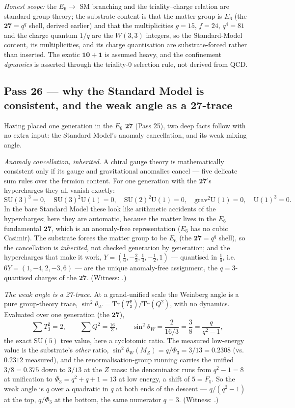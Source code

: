 \documentclass[11pt]{article}
\begin{document}
\emph{Honest scope:} the $E_6\to$ SM branching and the triality--charge relation are standard group
theory; the substrate content is that the matter group is $E_6$ (the $\mathbf{27}=q^q$ shell, derived
earlier) and that the multiplicities $g=15$, $f=24$, $q^4=81$ and the charge quantum $1/q$ are the
$W(3,3)$ integers, so the Standard-Model content, its multiplicities, and its charge quantisation are
substrate-forced rather than inserted. The exotic $\mathbf{10}+\mathbf1$ is assumed heavy, and the
confinement \emph{dynamics} is asserted through the triality-$0$ selection rule, not derived from QCD.

\subsection{Pass 26 --- why the Standard Model is consistent, and the weak angle as a 27-trace}
\label{sec:capstone-twentysix}

Having placed one generation in the $E_6$ $\mathbf{27}$ (Pass 25), two deep facts follow with no
extra input: the Standard Model's anomaly cancellation, and its weak mixing angle.

\emph{Anomaly cancellation, inherited.} A chiral gauge theory is mathematically consistent only if
its gauge and gravitational anomalies cancel --- five delicate sum rules over the fermion content.
For one generation with the $\mathbf{27}$'s hypercharges they all vanish exactly:
\[
\mathrm{SU}(3)^3=0,\quad \mathrm{SU}(3)^2\mathrm{U}(1)=0,\quad \mathrm{SU}(2)^2\mathrm{U}(1)=0,\quad
\mathrm{grav}^2\mathrm{U}(1)=0,\quad \mathrm{U}(1)^3=0.
\]
In the bare Standard Model these look like arithmetic accidents of the hypercharges; here they are
automatic, because the matter lives in the $E_6$ fundamental $\mathbf{27}$, which is an anomaly-free
representation ($E_6$ has no cubic Casimir). The substrate forces the matter group to be $E_6$ (the
$\mathbf{27}=q^q$ shell), so the cancellation is \emph{inherited}, not checked generation by
generation; and the hypercharges that make it work, $Y=(\tfrac16,-\tfrac23,\tfrac13,-\tfrac12,1)$
--- quantised in $\tfrac16$, i.e.\ $6Y=(1,-4,2,-3,6)$ --- are the unique anomaly-free assignment, the
$q=3$-quantised charges of the $\mathbf{27}$. (Witness:
.)

\emph{The weak angle is a 27-trace.} At a grand-unified scale the Weinberg angle is a pure
group-theory trace, $\sin^2\theta_W=\mathrm{Tr}(T_3^2)/\mathrm{Tr}(Q^2)$, with no dynamics.
Evaluated over one generation (the $\mathbf{27}$),
\[
\sum T_3^2=2,\qquad \sum Q^2=\tfrac{16}{3},\qquad
\sin^2\theta_W=\frac{2}{16/3}=\frac38=\frac{q}{q^2-1},
\]
the exact $\mathrm{SU}(5)$ tree value, here a cyclotomic ratio. The measured low-energy value is the
substrate's \emph{other} ratio, $\sin^2\theta_W(M_Z)=q/\Phi_3=3/13=0.2308$ (vs.\ $0.2312$ measured),
and the renormalisation-group running carries the unified $3/8=0.375$ down to $3/13$ at the $Z$ mass:
the denominator runs from $q^2-1=8$ at unification to $\Phi_3=q^2+q+1=13$ at low energy, a shift of
$5=F_5$. So the weak angle is $q$ over a quadratic in $q$ at both ends of the descent ---
$q/(q^2-1)$ at the top, $q/\Phi_3$ at the bottom, the same numerator $q=3$. (Witness:
.)
\end{document}
